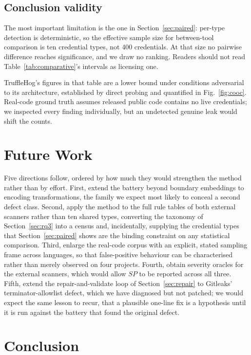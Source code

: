 \documentclass[journal]{IEEEtran}
\begin{document}
\subsection{Conclusion validity}

The most important limitation is the one in Section~\ref{sec:paired}: per-type detection is deterministic, so the effective sample size for between-tool comparison is ten credential types, not 400 credentials. At that size no pairwise difference reaches significance, and we draw no ranking. Readers should not read Table~\ref{tab:comparative}'s intervals as licensing one.

TruffleHog's figures in that table are a lower bound under conditions adversarial to its architecture, established by direct probing and quantified in Fig.~\ref{fig:cooc}. Real-code ground truth assumes released public code contains no live credentials; we inspected every finding individually, but an undetected genuine leak would shift the counts.

\section{Future Work}
\label{sec:future}

Five directions follow, ordered by how much they would strengthen the method rather than by effort. First, extend the battery beyond boundary embeddings to encoding transformations, the family we expect most likely to conceal a second defect class. Second, apply the method to the full rule tables of both external scanners rather than ten shared types, converting the taxonomy of Section~\ref{sec:rq3} into a census and, incidentally, supplying the credential types that Section~\ref{sec:paired} shows are the binding constraint on any statistical comparison. Third, enlarge the real-code corpus with an explicit, stated sampling frame across languages, so that false-positive behaviour can be characterised rather than merely observed on four projects. Fourth, obtain severity oracles for the external scanners, which would allow $SP$ to be reported across all three. Fifth, extend the repair-and-validate loop of Section~\ref{sec:repair} to Gitleaks' terminator-allowlist defect, which we have diagnosed but not patched; we would expect the same lesson to recur, that a plausible one-line fix is a hypothesis until it is run against the battery that found the original defect.

\section{Conclusion}
\end{document}
